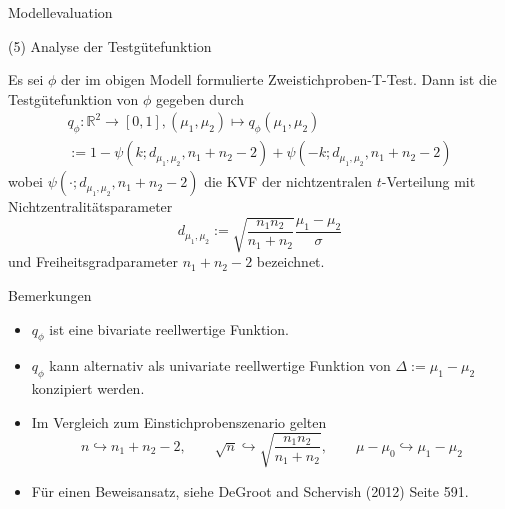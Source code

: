 \documentclass[
  8pt,
  ignorenonframetext,
]{beamer}
\providecommand{\tightlist}{%
  \setlength{\itemsep}{0pt}\setlength{\parskip}{0pt}}
\begin{document}
\begin{frame}{Modellevaluation}
\protect\hypertarget{modellevaluation-29}{}

\noindent (5) Analyse der Testgütefunktion

\footnotesize
\begin{theorem}[Testgütefunktion]
\justifying
\normalfont
Es sei $\phi$ der im obigen Modell formulierte Zweistichproben-T-Test. Dann ist
die Testgütefunktion von $\phi$ gegeben durch
\begin{multline}
q_{\phi} : \mathbb{R}^2 \to [0,1],
(\mu_1, \mu_2) \mapsto q_{\phi}(\mu_1, \mu_2)
\\ := 1 - \psi(k;d_{\mu_1,\mu_2},n_1+n_2-2) + \psi(-k;d_{\mu_1,\mu_2},n_1+n_2-2)
\end{multline}
wobei $\psi(\cdot; d_{\mu_1,\mu_2}, n_1+n_2-2)$  die KVF der nichtzentralen
$t$-Verteilung mit Nichtzentralitätsparameter
\begin{equation}
d_{\mu_1,\mu_2} := \sqrt{\frac{n_1n_2}{n_1+n_2}}\frac{\mu_1-\mu_2}{\sigma}
\end{equation}
und Freiheitsgradparameter $n_1+n_2-2$ bezeichnet.
\end{theorem}

Bemerkungen

\begin{itemize}
\tightlist
\item
  \(q_{\phi}\) ist eine bivariate reellwertige Funktion.
\item
  \(q_{\phi}\) kann alternativ als univariate reellwertige Funktion von
  \(\Delta := \mu_1 - \mu_2\) konzipiert werden.
\item
  Im Vergleich zum Einstichprobenszenario gelten \begin{equation}
  n \hookrightarrow n_1+n_2-2,\quad\quad
  \sqrt{n} \hookrightarrow \sqrt{\frac{n_1n_2}{n_1 + n_2}},\quad\quad
  \mu - \mu_0  \hookrightarrow \mu_1 - \mu_2
  \end{equation}
\item
  Für einen Beweisansatz, siehe DeGroot and Schervish (2012) Seite 591.
\end{itemize}
\end{frame}
\end{document}
